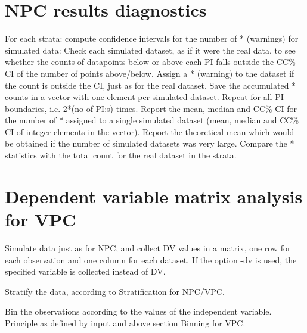 \section{NPC results diagnostics}
For each strata: compute confidence intervals for the number of * (warnings) for simulated data: Check each simulated dataset, as if it were the real data, to see whether the counts of datapoints below or above each PI falls outside the CC\% CI of the number of points above/below. Assign a * (warning) to the dataset if the count is outside the CI, just as for the real dataset. Save the accumulated * counts in a vector with one element per simulated dataset. Repeat for all PI boundaries, i.e. 2*(no of PI:s) times. Report the mean, median and CC\% CI for the number of * assigned to a single simulated dataset (mean, median and CC\% CI of integer elements in the vector). Report the theoretical mean which would be obtained if the number of simulated datasets was very large. Compare the * statistics with the total count for the real dataset in the strata. 

\section{Dependent variable matrix analysis for VPC}
Simulate data just as for NPC, and collect DV values in a matrix, one row for each observation and one column for each dataset. If the option -dv is used, the specified variable is collected instead of DV.

Stratify the data, according to Stratification for NPC/VPC.

Bin the observations according to the values of the independent variable. Principle as defined by input and above section Binning for VPC.

